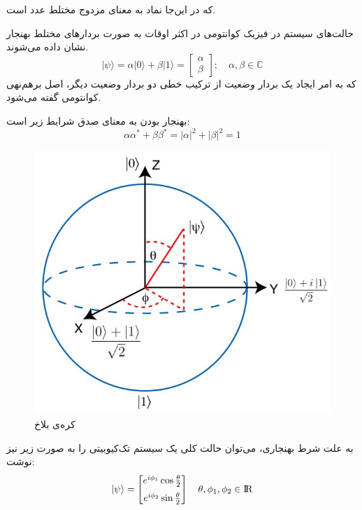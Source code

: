 که در این‌جا نماد \lr{$\alpha^*$}
به معنای مزدوج مختلط 
عدد \lr{$\alpha$}
است.
\newpage

حالت‌های سیستم در فیزیک کوانتومی در اکثر اوقات به صورت بردارهای مختلط بهنجار
نشان داده می‌شوند.
\begin{equation}
    |\psi\rangle = \alpha |0\rangle + \beta |1\rangle = \begin{bmatrix} \alpha \\ \beta \end{bmatrix} 
    ; \mspace{18mu}
    \alpha, \beta \in \mathbb{C}
\end{equation}
{}
که به امر ایجاد یک بردار وضعیت از ترکیب خطی دو بردار وضعیت دیگر، اصل برهم‌نهی کوانتومی
گفته می‌شود.

بهنجار بودن به معنای صدق شرایط زیر است:
\begin{equation}
    \alpha\alpha^* + \beta\beta^* = |\alpha|^2 + |\beta|^2 = 1
\end{equation}
\begin{figure}
	\centering
	\includegraphics[scale=0.4]{figures/bloch.jpg}
	\caption{کره‌ی بلاخ}
	\label{fig:bloch}
\end{figure}
به علت شرط بهنجاری، می‌توان حالت کلی یک سیستم تک‌کیوبیتی را به صورت زیر نیز نوشت:
\begin{equation}
|\psi\rangle = \begin{bmatrix} e^{i\phi_1}\cos{\tfrac{\theta}{2}} \\[6pt] e^{i\phi_2}\sin{\tfrac{\theta}{2}} \end{bmatrix} 
\mspace{18mu}
\theta, \phi_1, \phi_2 \in {\rm I\!R}
\end{equation}

